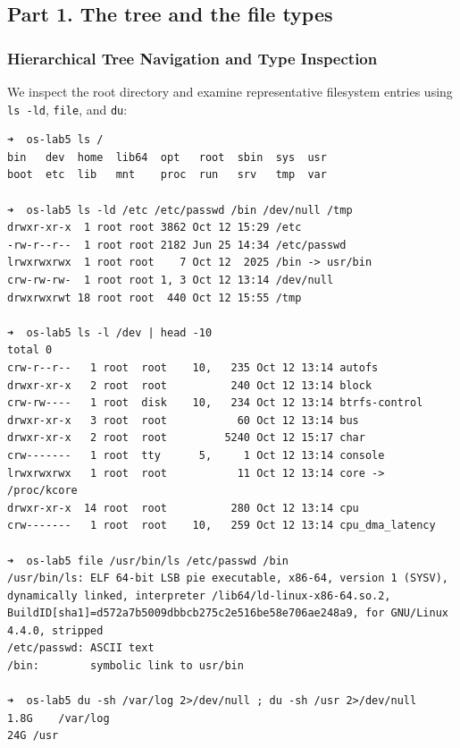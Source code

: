 \documentclass{labreport}
\begin{document}
\subsection{Part 1. The tree and the file types}

\subsubsection{Hierarchical Tree Navigation and Type Inspection}
We inspect the root directory and examine representative filesystem entries using \texttt{ls -ld}, \texttt{file}, and \texttt{du}:

\begin{lstlisting}[style=bash]
➜  os-lab5 ls /
bin   dev  home  lib64	opt   root  sbin  sys  usr
boot  etc  lib	 mnt	proc  run   srv   tmp  var

➜  os-lab5 ls -ld /etc /etc/passwd /bin /dev/null /tmp
drwxr-xr-x  1 root root 3862 Oct 12 15:29 /etc
-rw-r--r--  1 root root 2182 Jun 25 14:34 /etc/passwd
lrwxrwxrwx  1 root root    7 Oct 12  2025 /bin -> usr/bin
crw-rw-rw-  1 root root 1, 3 Oct 12 13:14 /dev/null
drwxrwxrwt 18 root root  440 Oct 12 15:55 /tmp

➜  os-lab5 ls -l /dev | head -10
total 0
crw-r--r--   1 root  root    10,   235 Oct 12 13:14 autofs
drwxr-xr-x   2 root  root          240 Oct 12 13:14 block
crw-rw----   1 root  disk    10,   234 Oct 12 13:14 btrfs-control
drwxr-xr-x   3 root  root           60 Oct 12 13:14 bus
drwxr-xr-x   2 root  root         5240 Oct 12 15:17 char
crw-------   1 root  tty      5,     1 Oct 12 13:14 console
lrwxrwxrwx   1 root  root           11 Oct 12 13:14 core -> /proc/kcore
drwxr-xr-x  14 root  root          280 Oct 12 13:14 cpu
crw-------   1 root  root    10,   259 Oct 12 13:14 cpu_dma_latency

➜  os-lab5 file /usr/bin/ls /etc/passwd /bin
/usr/bin/ls: ELF 64-bit LSB pie executable, x86-64, version 1 (SYSV), dynamically linked, interpreter /lib64/ld-linux-x86-64.so.2, BuildID[sha1]=d572a7b5009dbbcb275c2e516be58e706ae248a9, for GNU/Linux 4.4.0, stripped
/etc/passwd: ASCII text
/bin:        symbolic link to usr/bin

➜  os-lab5 du -sh /var/log 2>/dev/null ; du -sh /usr 2>/dev/null
1.8G	/var/log
24G	/usr
\end{lstlisting}
\end{document}
